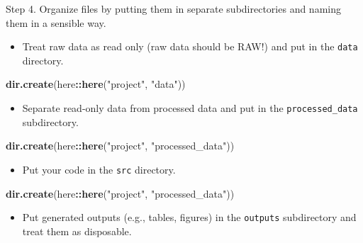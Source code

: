 \documentclass[
]{book}
\newenvironment{Shaded}{\begin{snugshade}}{\end{snugshade}}
\newcommand{\KeywordTok}[1]{\textcolor[rgb]{0.13,0.29,0.53}{\textbf{#1}}}
\newcommand{\NormalTok}[1]{#1}
\newcommand{\OperatorTok}[1]{\textcolor[rgb]{0.81,0.36,0.00}{\textbf{#1}}}
\newcommand{\StringTok}[1]{\textcolor[rgb]{0.31,0.60,0.02}{#1}}
\providecommand{\tightlist}{%
  \setlength{\itemsep}{0pt}\setlength{\parskip}{0pt}}
\begin{document}
Step 4. Organize files by putting them in separate subdirectories and naming them in a sensible way.

\begin{itemize}
\tightlist
\item
  Treat raw data as read only (raw data should be RAW!) and put in the \texttt{data} directory.
\end{itemize}

\begin{Shaded}
\begin{Highlighting}[]
\KeywordTok{dir.create}\NormalTok{(here}\OperatorTok{::}\KeywordTok{here}\NormalTok{(}\StringTok{"project"}\NormalTok{, }\StringTok{"data"}\NormalTok{))}
\end{Highlighting}
\end{Shaded}

\begin{itemize}
\tightlist
\item
  Separate read-only data from processed data and put in the \texttt{processed\_data} subdirectory.
\end{itemize}

\begin{Shaded}
\begin{Highlighting}[]
\KeywordTok{dir.create}\NormalTok{(here}\OperatorTok{::}\KeywordTok{here}\NormalTok{(}\StringTok{"project"}\NormalTok{, }\StringTok{"processed\_data"}\NormalTok{))}
\end{Highlighting}
\end{Shaded}

\begin{itemize}
\tightlist
\item
  Put your code in the \texttt{src} directory.
\end{itemize}

\begin{Shaded}
\begin{Highlighting}[]
\KeywordTok{dir.create}\NormalTok{(here}\OperatorTok{::}\KeywordTok{here}\NormalTok{(}\StringTok{"project"}\NormalTok{, }\StringTok{"processed\_data"}\NormalTok{))}
\end{Highlighting}
\end{Shaded}

\begin{itemize}
\tightlist
\item
  Put generated outputs (e.g., tables, figures) in the \texttt{outputs} subdirectory and treat them as disposable.
\end{itemize}
\end{document}
